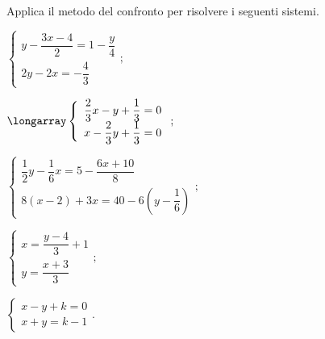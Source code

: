 \begin{esercizio}[\Ast]
 \label{ese:21.18}
Applica il metodo del confronto per risolvere i seguenti sistemi.
 \begin{multicols}{2}
 \begin{enumeratea}
\item $\left\{\begin{array}{l}y-\dfrac{3x-4}{2}=1-\dfrac{y}{4}\\2y-2x=-{\dfrac{4}{3}}\end{array}\right.;$
\item $\longarray\left\{\begin{array}{l}\dfrac{2}{3}x-y+\dfrac{1}{3}=0\\x-\dfrac{2}{3}y+\dfrac{1}{3}=0\end{array}\right.;$
\item $\left\{\begin{array}{l}\dfrac{1}{2}y-\dfrac{1}{6}x=5-\dfrac{6x+10}{8}\\8(x-2)+3x=40-6\left(y-\dfrac{1}{6}\right)\end{array}\right.;$
\item $\left\{\begin{array}{l}x=\dfrac{y-4}{3}+1\\y=\dfrac{x+3}{3}\end{array}\right.;$
\item $\left\{\begin{array}{l}x-y+k=0\\x+y=k-1\end{array}\right..$
 \end{enumeratea}
 \end{multicols}
\end{esercizio}

